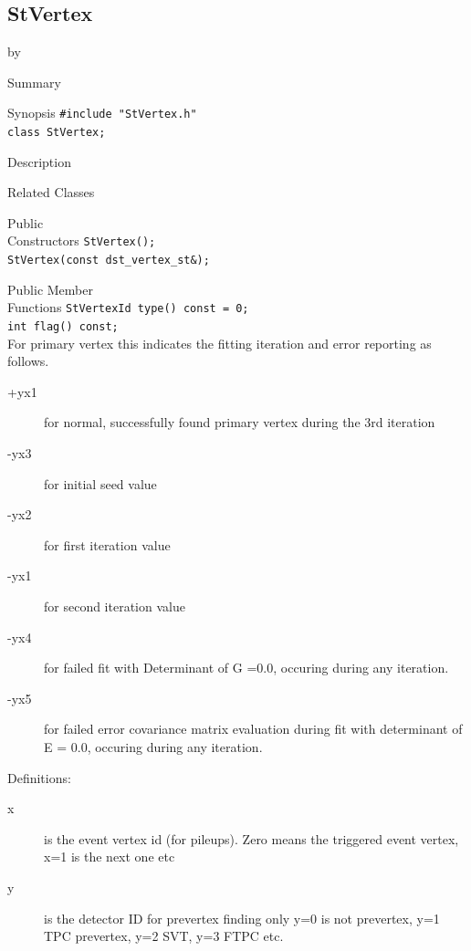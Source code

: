 \documentclass[twoside]{article}
\newcommand{\entrylabel}[1]{\mbox{\textbf{{#1}}}\hfil}%
\newenvironment{entry}
{\begin{list}{}%
    {\renewcommand{\makelabel}{\entrylabel}%
     \setlength{\labelwidth}{90pt}%
     \setlength{\leftmargin}{\labelwidth}
     \advance\leftmargin by \labelsep%
      }%
    }%
  {\end{list}}
\newcommand{\Entrylabel}[1]%
{\raisebox{0pt}[1ex][0pt]{\makebox[\labelwidth][l]%
    {\parbox[t]{\labelwidth}{\hspace{0pt}\textbf{{#1}}}}}}
\newenvironment{Entry}%
{\renewcommand{\entrylabel}{\Entrylabel}\begin{entry}}%
  {\end{entry}}
\begin{document}
\subsection{StVertex}
\label{sec:StVertex}
\begin{Entry}
\item[Summary]
\item[Synopsis]
    \verb+#include "StVertex.h"+\\
    \verb+class StVertex;+\\
\item[Description]
\item[Related Classes]
\item[Public\\ Constructors]
    \verb+StVertex();+\\
    \verb+StVertex(const dst_vertex_st&);+\\
\item[Public Member\\ Functions]
    \verb+StVertexId type() const = 0;+\\

    \verb+int flag() const;+\\  
    For primary vertex this indicates the fitting iteration and error reporting as follows.
    \begin{description}
    \item[+yx1] for normal, successfully found primary vertex during the 3rd iteration
    \item[-yx3] for initial seed value
    \item[-yx2] for first iteration value
    \item[-yx1] for second iteration value
    \item[-yx4] for failed fit with Determinant of G =0.0, occuring during any iteration.
    \item[-yx5] for failed error covariance matrix evaluation during
        fit with determinant of E = 0.0, occuring during any iteration.
    \end{description}
    Definitions: 
    \begin{description}
      \item[x] is the event vertex id (for pileups). Zero means the triggered event vertex, x=1 is the next one etc 
      \item[y] is the detector ID for prevertex finding only 
        y=0 is not prevertex, y=1 TPC prevertex, y=2 SVT, y=3 FTPC etc.
    \end{description}    


\end{Entry}
\end{document}
